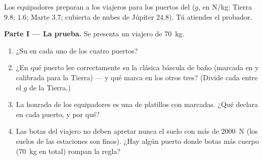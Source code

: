 \begin{problem}\label{pb:g9:weight-vs-mass:1}
Los equipadores preparan a los viajeros para los puertos del
 ($g$, en \unit{N/kg}: Tierra $9.8$;  $1.6$;
Marte $3.7$; cubierta de nubes de Júpiter $24.8$). Tú atiendes el
probador.

\medskip\noindent\textbf{Parte I --- La prueba.}
Se presenta un viajero de  \qty{70}{kg}.
\begin{enumerate}
  \item ¿Su  en cada uno de los cuatro puertos?
  \item ¿En qué puerto lee correctamente su  la clásica
        báscula de baño (marcada en  y calibrada para
        la Tierra) --- y qué marca en los otros tres? (Divide cada
         entre el $g$ de la Tierra.)
  \item La  honrada de los equipadores es una  de
        platillos con  marcadas. ¿Qué declara en cada puerto, y
        por qué?
  \item Las botas del viajero no deben apretar nunca el suelo con
        más de \qty{2000}{N} (los suelos de las estaciones son
        finos). ¿Hay algún puerto donde botas más cuerpo
        (\qty{70}{kg} en total) rompan la regla?
\end{enumerate}


\end{problem}
